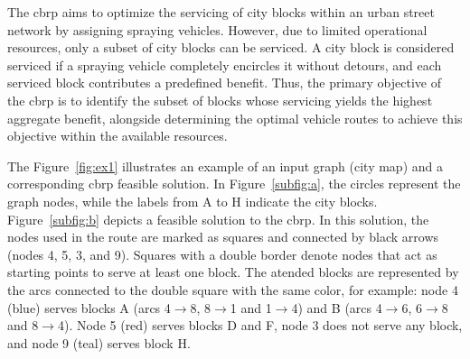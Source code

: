 The \gls{cbrp} aims to optimize the servicing of city blocks within an urban
street network by assigning spraying vehicles. However, due to limited
operational resources, only a subset of city blocks can be serviced. A city
block is considered serviced if a spraying vehicle completely encircles it
without detours, and each serviced block contributes a predefined benefit. Thus,
the primary objective of the \gls{cbrp} is to identify the subset of blocks
whose servicing yields the highest aggregate benefit, alongside determining the
optimal vehicle routes to achieve this objective within the available resources.

The Figure~\ref{fig:ex1} illustrates an example of an input graph (city map) and
a corresponding \gls{cbrp} feasible solution. In Figure~\ref{subfig:a}, the
circles represent the graph nodes, while the labels from A to H indicate the
city blocks. Figure~\ref{subfig:b} depicts a feasible solution to the
\gls{cbrp}. In this solution, the nodes used in the route are marked as squares
and connected by black arrows (nodes 4, 5, 3, and 9). Squares with a double
border denote nodes that act as starting points to serve at least one block. The
atended blocks are represented by the arcs connected to the double square with
the same color, for example: node 4 (blue) serves blocks A (arcs
4$\rightarrow$8, 8$\rightarrow$1 and 1$\rightarrow$4) and B (arcs
4$\rightarrow$6, 6$\rightarrow$8 and 8$\rightarrow$4). Node 5 (red) serves
blocks D and F, node 3 does not serve any block, and node 9 (teal) serves block
H.

